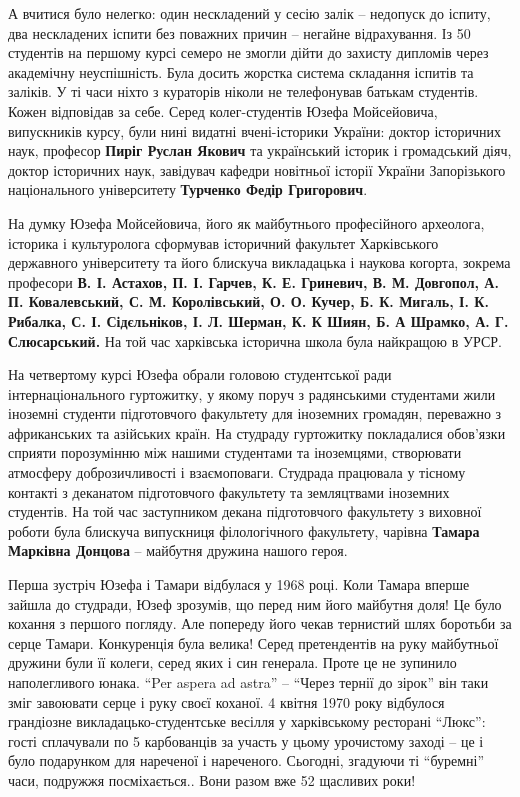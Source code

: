 А вчитися було нелегко: один нескладений у сесію залік – недопуск до іспиту,
два нескладених іспити без поважних причин – негайне відрахування. Із 50
студентів на першому курсі семеро не змогли дійти до захисту дипломів через
академічну неуспішність. Була досить жорстка система складання іспитів та
заліків. У ті часи ніхто з кураторів ніколи не телефонував батькам студентів.
Кожен відповідав за себе. Серед колег-студентів Юзефа Мойсейовича, випускників
курсу, були нині видатні вчені-історики України: доктор історичних наук,
професор \textbf{Пиріг Руслан Якович} та український історик і громадський діяч, доктор
історичних наук, завідувач кафедри новітньої історії України Запорізького
національного університету \textbf{Турченко Федір Григорович}.


На думку Юзефа Мойсейовича, його як майбутнього професійного археолога,
історика і культуролога сформував історичний факультет Харківського державного
університету та його блискуча викладацька і наукова когорта, зокрема професори
\textbf{В. І. Астахов, П. І. Гарчев, К. Е. Гриневич, В. М. Довгопол, А. П.
Ковалевський, С. М. Королівський, О. О. Кучер, Б. К. Мигаль, І. К. Рибалка, С.
І. Сідєльніков, І. Л. Шерман, К. К Шиян, Б. А Шрамко, А. Г. Слюсарський.} На той
час харківська історична школа була найкращою в УРСР.

На четвертому курсі Юзефа обрали головою студентської ради інтернаціонального
гуртожитку, у якому поруч з радянськими студентами жили іноземні студенти
підготовчого факультету для іноземних громадян, переважно з африканських та
азійських країн. На студраду гуртожитку покладалися обов'язки сприяти
порозумінню між нашими студентами та іноземцями, створювати атмосферу
доброзичливості і взаємоповаги. Студрада працювала у тісному контакті з
деканатом підготовчого факультету та земляцтвами іноземних студентів. На той
час заступником декана підготовчого факультету з виховної роботи була блискуча
випускниця філологічного факультету, чарівна \textbf{Тамара Марківна Донцова} – майбутня
дружина нашого героя.


Перша зустріч Юзефа і Тамари відбулася у 1968 році. Коли Тамара вперше зайшла
до студради, Юзеф зрозумів, що перед ним його майбутня доля! Це було кохання з
першого погляду. Але попереду його чекав тернистий шлях боротьби за серце
Тамари. Конкуренція була велика! Серед претендентів на руку майбутньої дружини
були її колеги, серед яких і син генерала. Проте це не зупинило наполегливого
юнака. \enquote{Per aspera ad astra} – \enquote{Через тернії до зірок} він таки зміг завоювати
серце і руку своєї коханої. 4 квітня 1970 року відбулося грандіозне
викладацько-студентське весілля у харківському ресторані \enquote{Люкс}: гості
сплачували по 5 карбованців за участь у цьому урочистому заході – це і було
подарунком для нареченої і нареченого. Сьогодні, згадуючи ті \enquote{буремні} часи,
подружжя посміхається.. Вони разом вже 52 щасливих роки!

